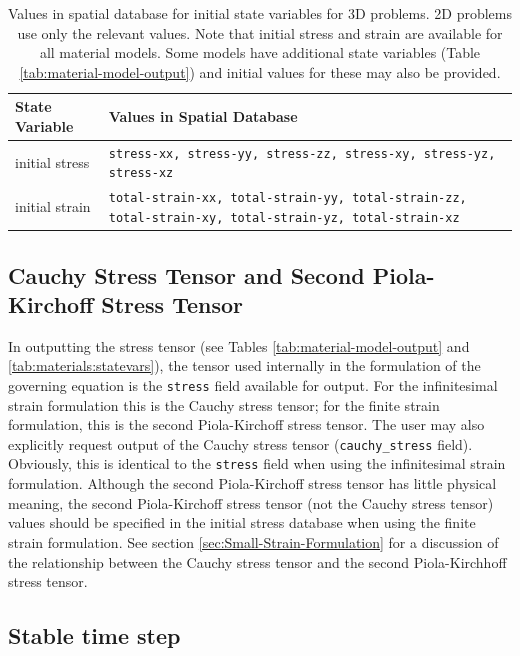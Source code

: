 \noindent \begin{center}
\begin{table}[H]
\noindent \centering{}\caption{Values in spatial database for initial state variables for 3D problems.
2D problems use only the relevant values. Note that initial stress
and strain are available for all material models. Some models have
additional state variables (Table \vref{tab:material-model-output})
and initial values for these may also be provided.}
\begin{tabular}{|>{\centering}m{0.85in}|>{\centering}m{2.47in}|}
\hline 
\textbf{State Variable} & \centering{}\textbf{Values in Spatial Database}\tabularnewline
\hline 
\hline 
initial stress & \texttt{stress-xx, stress-yy, stress-zz, stress-xy, stress-yz, stress-xz}\tabularnewline
\hline 
initial strain & \texttt{total-strain-xx, total-strain-yy, total-strain-zz, total-strain-xy,
total-strain-yz, total-strain-xz}\tabularnewline
\hline 
\end{tabular}
\end{table}

\par\end{center}


\subsection{Cauchy Stress Tensor and Second Piola-Kirchoff Stress Tensor}

In outputting the stress tensor (see Tables \vref{tab:material-model-output}
and \vref{tab:materials:statevars}), the tensor used internally
in the formulation of the governing equation is the \texttt{stress}
field available for output. For the infinitesimal strain formulation
this is the Cauchy stress tensor; for the finite strain formulation,
this is the second Piola-Kirchoff stress tensor. The user may also
explicitly request output of the Cauchy stress tensor (\texttt{cauchy\_stress}
field). Obviously, this is identical to the \texttt{stress} field
when using the infinitesimal strain formulation. Although the second
Piola-Kirchoff stress tensor has little physical meaning, the second
Piola-Kirchoff stress tensor (not the Cauchy stress tensor) values
should be specified in the initial stress database when using the
finite strain formulation. See section \vref{sec:Small-Strain-Formulation}
for a discussion of the relationship between the Cauchy stress tensor
and the second Piola-Kirchhoff stress tensor.


\subsection{\label{sec:stable:time:step}Stable time step}

